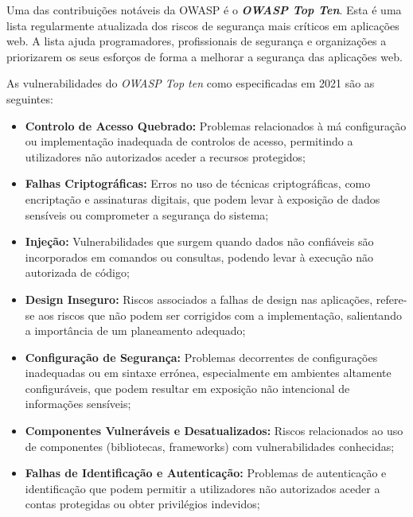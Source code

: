       Uma das contribuições notáveis da OWASP é o \textbf{\textit{OWASP Top Ten}}. Esta é uma lista regularmente atualizada dos riscos de segurança mais críticos em aplicações web. A lista ajuda programadores, profissionais de segurança e organizações a priorizarem os seus esforços de forma a melhorar a segurança das aplicações web.
      
      As vulnerabilidades do \textit{OWASP Top ten} como especificadas em 2021 são as seguintes:

      \begin{itemize}
        \item \textbf{Controlo de Acesso Quebrado:} Problemas relacionados à má configuração ou implementação inadequada de controlos de acesso, permitindo a utilizadores não autorizados aceder a recursos protegidos;
      
        \item \textbf{Falhas Criptográficas:} Erros no uso de técnicas criptográficas, como encriptação e assinaturas digitais, que podem levar à exposição de dados sensíveis ou comprometer a segurança do sistema;
      
        \item \textbf{Injeção:} Vulnerabilidades que surgem quando dados não confiáveis são incorporados em comandos ou consultas, podendo levar à execução não autorizada de código;
      
        \item \textbf{Design Inseguro:} Riscos associados a falhas de design nas aplicações, refere-se aos riscos que não podem ser corrigidos com a implementação, salientando a importância de um planeamento adequado;
      
        \item \textbf{Configuração de Segurança:} Problemas decorrentes de configurações inadequadas ou em sintaxe errónea, especialmente em ambientes altamente configuráveis, que podem resultar em exposição não intencional de informações sensíveis;
      
        \item \textbf{Componentes Vulneráveis e Desatualizados:} Riscos relacionados ao uso de componentes (bibliotecas, frameworks) com vulnerabilidades conhecidas;
      
        \item \textbf{Falhas de Identificação e Autenticação:} Problemas de autenticação e identificação que podem permitir a utilizadores não autorizados aceder a contas protegidas ou obter privilégios indevidos;
      

\end{itemize}
